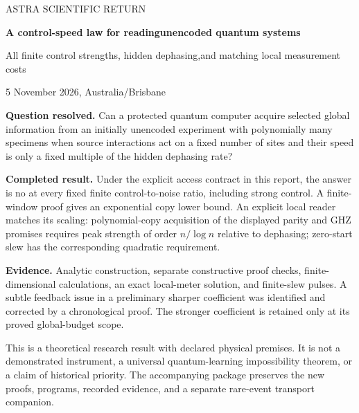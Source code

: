 \documentclass[11pt,a4paper]{article}
\begin{document}
\hypersetup{pageanchor=false}
\begin{titlepage}
\vspace*{12mm}
{\Large\color{MidnightBlue} ASTRA SCIENTIFIC RETURN\par}
\vspace{10mm}
{\huge\bfseries A control-speed law for reading\newline unencoded quantum systems\par}
\vspace{6mm}
{\Large All finite control strengths, hidden dephasing,\newline and matching local measurement costs\par}
\vspace{9mm}
{\large 5 November 2026, Australia/Brisbane\par}
\vspace{10mm}
\textbf{Question resolved.} Can a protected quantum computer acquire selected global information from an initially unencoded experiment with polynomially many specimens when source interactions act on a fixed number of sites and their speed is only a fixed multiple of the hidden dephasing rate?

\textbf{Completed result.} Under the explicit access contract in this report, the answer is no at every fixed finite control-to-noise ratio, including strong control. A finite-window proof gives an exponential copy lower bound. An explicit local reader matches its scaling: polynomial-copy acquisition of the displayed parity and GHZ promises requires peak strength of order $n/\log n$ relative to dephasing; zero-start slew has the corresponding quadratic requirement.

\textbf{Evidence.} Analytic construction, separate constructive proof checks, finite-dimensional calculations, an exact local-meter solution, and finite-slew pulses. A subtle feedback issue in a preliminary sharper coefficient was identified and corrected by a chronological proof. The stronger coefficient is retained only at its proved global-budget scope.

\vfill
This is a theoretical research result with declared physical premises. It is not a demonstrated instrument, a universal quantum-learning impossibility theorem, or a claim of historical priority. The accompanying package preserves the new proofs, programs, recorded evidence, and a separate rare-event transport companion.
\end{titlepage}
\hypersetup{pageanchor=true}
\end{document}
